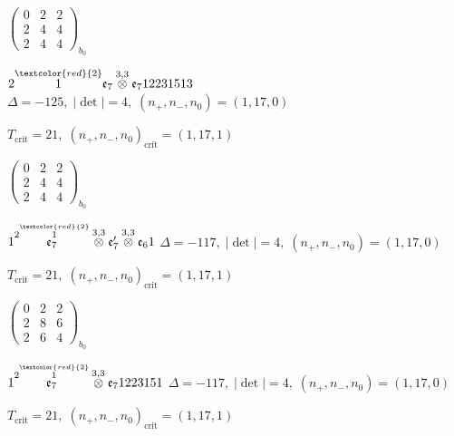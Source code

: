 \documentclass[10pt]{article}
\begin{document}
\hspace{2em}$\left(\begin{smallmatrix}0 & 2 & 2 \\ 2 & 4 & 4 \\ 2 & 4 & 4\end{smallmatrix}\right)_{\!b_0}$

\smallskip

$2\overset{\textcolor{red}{2}}{1}\mathfrak{e}_7\overset{3,3}{\otimes}\mathfrak{e}_712231513$ \quad $\Delta=-125,\; |\det|=4,\; (n_+,n_-,n_0)=(1,17,0)$

\hspace{1em}$T_{\text{crit}}=21,\; (n_+,n_-,n_0)_{\text{crit}}=(1,17,1)$

\hspace{2em}$\left(\begin{smallmatrix}0 & 2 & 2 \\ 2 & 4 & 4 \\ 2 & 4 & 4\end{smallmatrix}\right)_{\!b_0}$

\smallskip

$1\overset{2\overset{\textcolor{red}{2}}{1}}{\mathfrak{e}_7}\overset{3,3}{\otimes}\mathfrak{e}_7'\overset{3,3}{\otimes}\mathfrak{e}_61$ \quad $\Delta=-117,\; |\det|=4,\; (n_+,n_-,n_0)=(1,17,0)$

\hspace{1em}$T_{\text{crit}}=21,\; (n_+,n_-,n_0)_{\text{crit}}=(1,17,1)$

\hspace{2em}$\left(\begin{smallmatrix}0 & 2 & 2 \\ 2 & 8 & 6 \\ 2 & 6 & 4\end{smallmatrix}\right)_{\!b_0}$

\smallskip

$1\overset{2\overset{\textcolor{red}{2}}{1}}{\mathfrak{e}_7}\overset{3,3}{\otimes}\mathfrak{e}_71223151$ \quad $\Delta=-117,\; |\det|=4,\; (n_+,n_-,n_0)=(1,17,0)$

\hspace{1em}$T_{\text{crit}}=21,\; (n_+,n_-,n_0)_{\text{crit}}=(1,17,1)$
\end{document}
